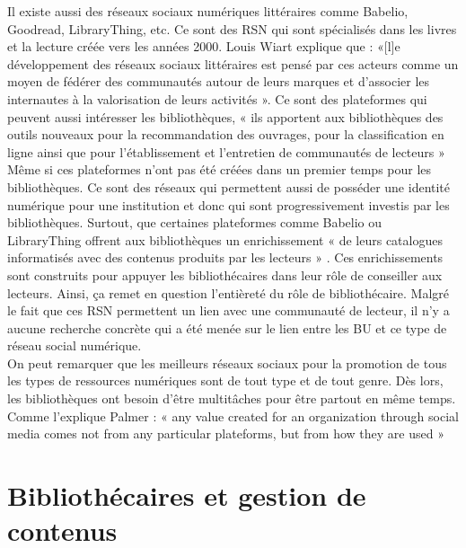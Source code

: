 \documentclass[a4paper,11pt]{article} %
\begin{document}
Il existe aussi des réseaux sociaux numériques littéraires comme Babelio, Goodread, 
LibraryThing, etc. Ce sont des RSN qui sont spécialisés dans les livres et la lecture créée vers les années 2000. Louis Wiart explique que : «[l]e développement des réseaux sociaux littéraires est pensé par ces acteurs comme un moyen de fédérer des communautés autour de leurs marques et d’associer les internautes à la valorisation de leurs activités ».\citep{wiart2019presence,} Ce sont des plateformes qui peuvent aussi intéresser les bibliothèques, «
ils apportent aux bibliothèques des outils nouveaux pour la recommandation des ouvrages, pour la classification en ligne ainsi que pour l’établissement et l’entretien de communautés de lecteurs » \citep{wiart2019presence,} \\
Même si ces plateformes n’ont pas été créées dans un premier temps pour les bibliothèques. Ce sont des réseaux qui permettent aussi de posséder une identité numérique pour une institution et donc qui sont progressivement investis par les bibliothèques. Surtout, que certaines plateformes comme Babelio ou LibraryThing offrent aux bibliothèques un enrichissement « de leurs catalogues informatisés avec des contenus produits par les lecteurs » \citep{wiart2019presence,}. Ces enrichissements sont construits pour appuyer les bibliothécaires dans leur rôle de conseiller aux lecteurs. Ainsi, ça remet en question l’entièreté du rôle de bibliothécaire. Malgré le fait que ces RSN permettent un lien avec une communauté de lecteur, il n’y a aucune recherche concrète qui a été menée sur le lien entre les BU et ce type de réseau social numérique.\\
On peut remarquer que les meilleurs réseaux sociaux pour la promotion de tous les types de ressources numériques sont de tout type et de tout genre. Dès lors, les bibliothèques ont besoin d’être multitâches pour être partout en même temps. Comme l’explique Palmer : « any value created for an organization through social media comes not from any particular plateforms, but from how they are used » \citep{palmer2014characterizing,}

\section{Bibliothécaires et gestion de contenus}
\end{document}
